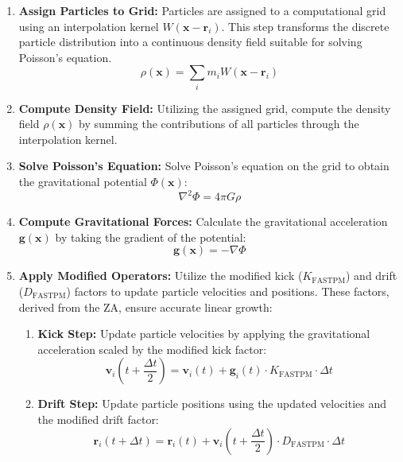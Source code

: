 \begin{enumerate}
    \item \textbf{Assign Particles to Grid:} 
    \label{fastpm:assign-grid}
    Particles are assigned to a computational grid using an interpolation kernel $W(\mathbf{x} - \mathbf{r}_i)$. This step transforms the discrete particle distribution into a continuous density field suitable for solving Poisson's equation.
    \[
    \rho(\mathbf{x}) = \sum_i m_i W(\mathbf{x} - \mathbf{r}_i)
    \]
    
    \item \textbf{Compute Density Field:}
    Utilizing the assigned grid, compute the density field $\rho(\mathbf{x})$ by summing the contributions of all particles through the interpolation kernel.
    
    \item \textbf{Solve Poisson's Equation:}
    \label{fastpm:poisson}
    Solve Poisson's equation on the grid to obtain the gravitational potential $\Phi(\mathbf{x})$:
    \[
    \nabla^2 \Phi = 4\pi G \rho
    \]
    
    \item \textbf{Compute Gravitational Forces:}
    Calculate the gravitational acceleration $\mathbf{g}(\mathbf{x})$ by taking the gradient of the potential:
    \[
    \mathbf{g}(\mathbf{x}) = -\nabla \Phi
    \]
    
    \item \textbf{Apply Modified Operators:}
    \label{fastpm:modified-kick-drift}
    Utilize the modified kick ($K_{\text{FASTPM}}$) and drift ($D_{\text{FASTPM}}$) factors to update particle velocities and positions. These factors, derived from the ZA, ensure accurate linear growth:
    
    \begin{enumerate}
        \item \textbf{Kick Step:}
        Update particle velocities by applying the gravitational acceleration scaled by the modified kick factor:
        \[
        \mathbf{v}_i\left(t + \frac{\Delta t}{2}\right) = \mathbf{v}_i(t) + \mathbf{g}_i(t) \cdot K_{\text{FASTPM}} \cdot \Delta t
        \]
        
        \item \textbf{Drift Step:}
        Update particle positions using the updated velocities and the modified drift factor:
        \[
        \mathbf{r}_i(t + \Delta t) = \mathbf{r}_i(t) + \mathbf{v}_i\left(t + \frac{\Delta t}{2}\right) \cdot D_{\text{FASTPM}} \cdot \Delta t
        \]
        

\end{enumerate}
\end{enumerate}
